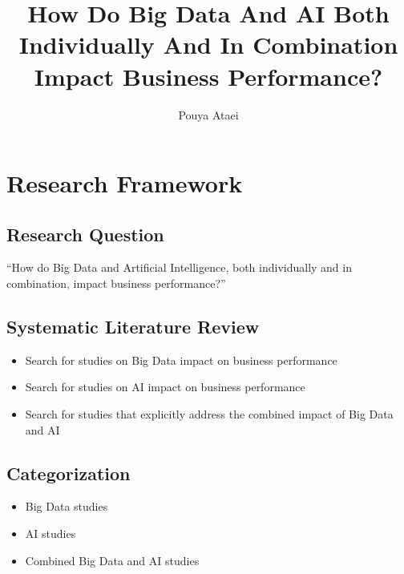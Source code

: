 \documentclass{article}
\title{How Do Big Data And AI Both Individually And In Combination Impact Business Performance?}
\author{Pouya Ataei}
\theoremstyle{mytheoremstyle}
\theoremstyle{mytheoremstyle}
\theoremstyle{myproblemstyle}
\begin{document}
    \maketitle


\section{Research Framework}

\subsection{Research Question}
``How do Big Data and Artificial Intelligence, both individually and in combination, impact business performance?''

\subsection{Systematic Literature Review}
\begin{itemize}
    \item Search for studies on Big Data impact on business performance
    \item Search for studies on AI impact on business performance
    \item Search for studies that explicitly address the combined impact of Big Data and AI
\end{itemize}

\subsection{Categorization}
\begin{itemize}
    \item Big Data studies
    \item AI studies
    \item Combined Big Data and AI studies
\end{itemize}
\end{document}
